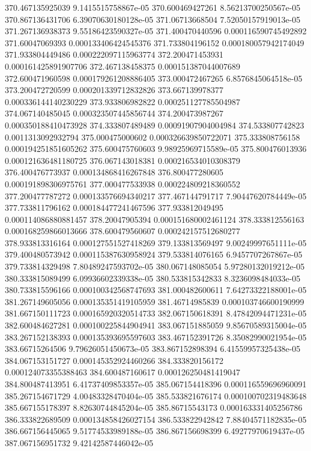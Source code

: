 {370.467135925039 9.1415515758867e-05
370.600469427261 8.56213700250567e-05
370.867136431706 6.39070630180128e-05
371.06713668504 7.52050157919013e-05
371.267136938373 9.55186423590327e-05
371.400470440596 0.000116590745492892
371.60047069393 0.000133406424545376
371.733804196152 0.000180057942174049
371.933804449486 0.000222097115963774
372.200471453931 0.000161425891907706
372.467138458375 0.000151387044007689
372.600471960598 0.000179261208886405
373.000472467265 6.8576845064518e-05
373.200472720599 0.000201339712832826
373.667139978377 0.000336144140230229
373.933806982822 0.000251127785504987
374.067140485045 0.000323507445856744
374.200473987267 0.000350188410473928
374.333807489489 0.00091907904004984
374.533807742823 0.0011313092932794
375.000475000602 0.000326639850722071
375.333808756158 0.000194251851605262
375.600475760603 9.98925969715589e-05
375.800476013936 0.000121636481180725
376.067143018381 0.000216534010308379
376.400476773937 0.000134868416267848
376.800477280605 0.000191898306975761
377.000477533938 0.000224809218360552
377.200477787272 0.000133576694340217
377.467144791717 7.90447620784449e-05
377.733811796162 0.000184477241467596
377.933812049495 0.000114086880881457
378.20047905394 0.000151680002461124
378.333812556163 0.000168259866013666
378.600479560607 0.000242157512680277
378.933813316164 0.000127551527418269
379.133813569497 9.00249997651111e-05
379.400480573942 0.000115387630958924
379.533814076165 6.9457707267867e-05
379.733814329498 7.80489247593702e-05
380.067148085054 5.97280132019212e-05
380.333815089499 6.09936602339338e-05
380.533815342833 8.3236098484033e-05
380.733815596166 0.000100342568747693
381.000482600611 7.64273322188001e-05
381.267149605056 0.000135351419105959
381.46714985839 0.000103746600190999
381.667150111723 0.000165920320514733
382.067150618391 8.47842094471231e-05
382.600484627281 0.000100225844904941
383.067151885059 9.85670589315004e-05
383.267152138393 0.000135393695597603
383.467152391726 8.35082990021954e-05
383.66715264506 9.79626051450673e-05
383.867152898394 6.41559957325438e-05
384.067153151727 0.000145352924460266
384.333820156172 0.000124073355388463
384.600487160617 0.000126250481419047
384.800487413951 6.41737409853357e-05
385.067154418396 0.000116559696960091
385.267154671729 4.00483328470404e-05
385.533821676174 0.000100702319483648
385.667155178397 8.82630744845204e-05
385.86715543173 0.000163331405256786
386.333822689509 0.000134858426027154
386.533822942842 7.88404571182835e-05
386.667156445065 9.51774533989188e-05
386.867156698399 6.49277970619437e-05
387.067156951732 9.42142587446042e-05
}
